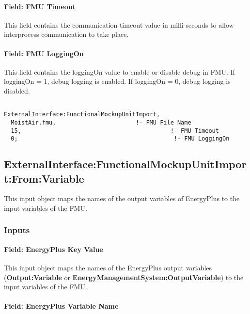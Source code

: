 \paragraph{Field: FMU Timeout}\label{field-fmu-timeout}

This field contains the communication timeout value in milli-seconds to allow interprocess communication to take place.

\paragraph{Field: FMU LoggingOn}\label{field-fmu-loggingon}

This field contains the loggingOn value to enable or disable debug in FMU. If loggingOn = 1, debug logging is enabled. If loggingOn = 0, debug logging is disabled.

\begin{lstlisting}

ExternalInterface:FunctionalMockupUnitImport,
  MoistAir.fmu,                       !- FMU File Name
  15,                                           !- FMU Timeout
  0;                                             !- FMU LoggingOn
\end{lstlisting}

\subsection{ExternalInterface:FunctionalMockupUnitImport:From:Variable}\label{externalinterfacefunctionalmockupunitimportfromvariable}

This input object maps the names of the output variables of EnergyPlus to the input variables of the FMU.

\subsubsection{Inputs}\label{inputs-5-010}

\paragraph{Field: EnergyPlus Key Value}\label{field-energyplus-key-value}

This input object maps the names of the EnergyPlus output variables (\textbf{Output:Variable} or \textbf{EnergyManagementSystem:OutputVariable}) to the input variables of the FMU.

\paragraph{Field: EnergyPlus Variable Name}\label{field-energyplus-variable-name}

